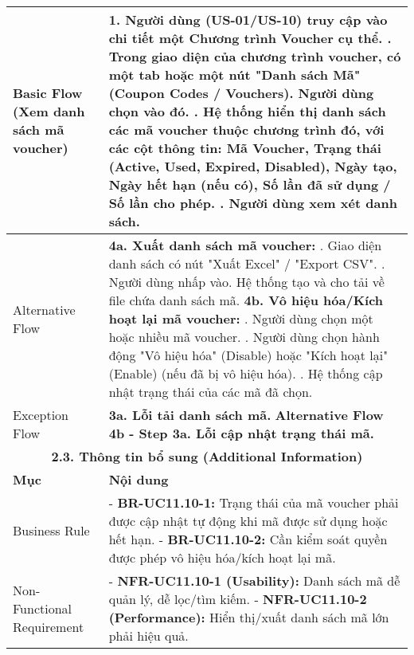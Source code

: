 \begin{longtable}{|m{4cm}|p{11cm}|}
\hline
Basic Flow (Xem danh sách mã voucher) & 1. Người dùng (US-01/US-10) truy cập vào chi tiết một Chương trình Voucher cụ thể. \newline 2. Trong giao diện của chương trình voucher, có một tab hoặc một nút "Danh sách Mã" (Coupon Codes / Vouchers). Người dùng chọn vào đó. \newline 3. Hệ thống hiển thị danh sách các mã voucher thuộc chương trình đó, với các cột thông tin: Mã Voucher, Trạng thái (Active, Used, Expired, Disabled), Ngày tạo, Ngày hết hạn (nếu có), Số lần đã sử dụng / Số lần cho phép. \newline 4. Người dùng xem xét danh sách. \\
\hline
Alternative Flow & \textbf{4a. Xuất danh sách mã voucher:} \newline    1. Giao diện danh sách có nút "Xuất Excel" / "Export CSV". \newline    2. Người dùng nhấp vào. Hệ thống tạo và cho tải về file chứa danh sách mã. \newline \textbf{4b. Vô hiệu hóa/Kích hoạt lại mã voucher:} \newline    1. Người dùng chọn một hoặc nhiều mã voucher. \newline    2. Người dùng chọn hành động "Vô hiệu hóa" (Disable) hoặc "Kích hoạt lại" (Enable) (nếu đã bị vô hiệu hóa). \newline    3. Hệ thống cập nhật trạng thái của các mã đã chọn. \\
\hline
Exception Flow & \textbf{3a. Lỗi tải danh sách mã.} \newline \textbf{Alternative Flow 4b - Step 3a. Lỗi cập nhật trạng thái mã.} \\
\hline
\multicolumn{2}{|c|}{\textbf{2.3. Thông tin bổ sung (Additional Information)}} \\
\hline
\textbf{Mục} & \textbf{Nội dung} \\
\hline
Business Rule & - \textbf{BR-UC11.10-1:} Trạng thái của mã voucher phải được cập nhật tự động khi mã được sử dụng hoặc hết hạn. \newline - \textbf{BR-UC11.10-2:} Cần kiểm soát quyền được phép vô hiệu hóa/kích hoạt lại mã. \\
\hline
Non-Functional Requirement & - \textbf{NFR-UC11.10-1 (Usability):} Danh sách mã dễ quản lý, dễ lọc/tìm kiếm. \newline - \textbf{NFR-UC11.10-2 (Performance):} Hiển thị/xuất danh sách mã lớn phải hiệu quả. \\
\hline
\end{longtable}

